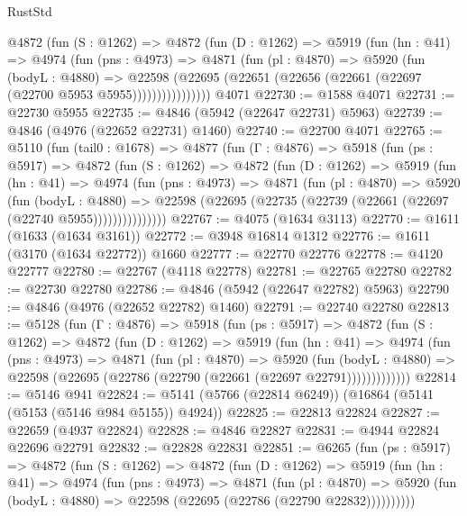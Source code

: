 \begin{lexlean}{RustStd}
\begin{coremodule}
          @4872
            (fun (S : @1262) =>
            @4872
              (fun (D : @1262) =>
              @5919
                (fun (hn : @41) =>
                @4974
                  (fun (pns : @4973) =>
                  @4871
                    (fun (pl : @4870) =>
                    @5920
                      (fun (bodyL : @4880) =>
                      @22598
                        (@22695 (@22651 (@22656 (@22661 (@22697 (@22700 @5953 @5955))))))))))))))))
    @4071
@22730 := @1588 @4071
@22731 := @22730 @5955
@22735 := @4846 (@5942 (@22647 @22731) @5963)
@22739 := @4846 (@4976 (@22652 @22731) @1460)
@22740 := @22700 @4071
@22765 := @5110
    (fun (tail0 : @1678) =>
    @4877
      (fun (Γ : @4876) =>
      @5918
        (fun (ps : @5917) =>
        @4872
          (fun (S : @1262) =>
          @4872
            (fun (D : @1262) =>
            @5919
              (fun (hn : @41) =>
              @4974
                (fun (pns : @4973) =>
                @4871
                  (fun (pl : @4870) =>
                  @5920
                    (fun (bodyL : @4880) =>
                    @22598 (@22695 (@22735 (@22739 (@22661 (@22697 (@22740 @5955)))))))))))))))
@22767 := @4075 (@1634 @3113)
@22770 := @1611 (@1633 (@1634 @3161))
@22772 := @3948 @16814 @1312
@22776 := @1611 (@3170 (@1634 @22772)) @1660
@22777 := @22770 @22776
@22778 := @4120 @22777
@22780 := @22767 (@4118 @22778)
@22781 := @22765 @22780
@22782 := @22730 @22780
@22786 := @4846 (@5942 (@22647 @22782) @5963)
@22790 := @4846 (@4976 (@22652 @22782) @1460)
@22791 := @22740 @22780
@22813 := @5128
    (fun (Γ : @4876) =>
    @5918
      (fun (ps : @5917) =>
      @4872
        (fun (S : @1262) =>
        @4872
          (fun (D : @1262) =>
          @5919
            (fun (hn : @41) =>
            @4974
              (fun (pns : @4973) =>
              @4871
                (fun (pl : @4870) =>
                @5920
                  (fun (bodyL : @4880) =>
                  @22598 (@22695 (@22786 (@22790 (@22661 (@22697 @22791)))))))))))))
@22814 := @5146 @941
@22824 := @5141 (@5766 (@22814 @6249)) (@16864 (@5141 (@5153 (@5146 @984 @5155)) @4924))
@22825 := @22813 @22824
@22827 := @22659 (@4937 @22824)
@22828 := @4846 @22827
@22831 := @4944 @22824 @22696 @22791
@22832 := @22828 @22831
@22851 := @6265
    (fun (ps : @5917) =>
    @4872
      (fun (S : @1262) =>
      @4872
        (fun (D : @1262) =>
        @5919
          (fun (hn : @41) =>
          @4974
            (fun (pns : @4973) =>
            @4871
              (fun (pl : @4870) =>
              @5920 (fun (bodyL : @4880) => @22598 (@22695 (@22786 (@22790 @22832))))))))))

\end{coremodule}
\end{lexlean}
